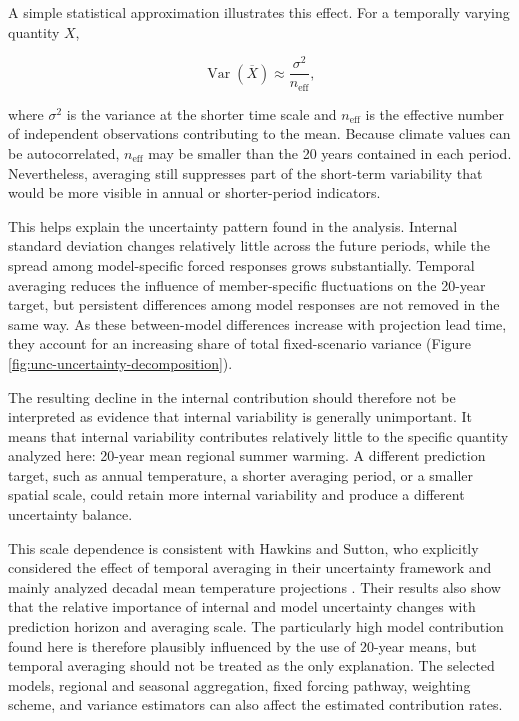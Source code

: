 \documentclass[
]{krantz}
\begin{document}
A simple statistical approximation illustrates this effect. For a temporally varying quantity \(X\),

\[
\operatorname{Var}(\overline{X})
\approx
\frac{\sigma^2}{n_{\mathrm{eff}}},
\]

where \(\sigma^2\) is the variance at the shorter time scale and \(n_{\mathrm{eff}}\) is the effective number of independent observations contributing to the mean. Because climate values can be autocorrelated, \(n_{\mathrm{eff}}\) may be smaller than the 20 years contained in each period. Nevertheless, averaging still suppresses part of the short-term variability that would be more visible in annual or shorter-period indicators.

This helps explain the uncertainty pattern found in the analysis. Internal standard deviation changes relatively little across the future periods, while the spread among model-specific forced responses grows substantially. Temporal averaging reduces the influence of member-specific fluctuations on the 20-year target, but persistent differences among model responses are not removed in the same way. As these between-model differences increase with projection lead time, they account for an increasing share of total fixed-scenario variance (Figure \ref{fig:unc-uncertainty-decomposition}).

The resulting decline in the internal contribution should therefore not be interpreted as evidence that internal variability is generally unimportant. It means that internal variability contributes relatively little to the specific quantity analyzed here: 20-year mean regional summer warming. A different prediction target, such as annual temperature, a shorter averaging period, or a smaller spatial scale, could retain more internal variability and produce a different uncertainty balance.

This scale dependence is consistent with Hawkins and Sutton, who explicitly considered the effect of temporal averaging in their uncertainty framework and mainly analyzed decadal mean temperature projections \citep{Hawkins2009}. Their results also show that the relative importance of internal and model uncertainty changes with prediction horizon and averaging scale. The particularly high model contribution found here is therefore plausibly influenced by the use of 20-year means, but temporal averaging should not be treated as the only explanation. The selected models, regional and seasonal aggregation, fixed forcing pathway, weighting scheme, and variance estimators can also affect the estimated contribution rates.
\end{document}
